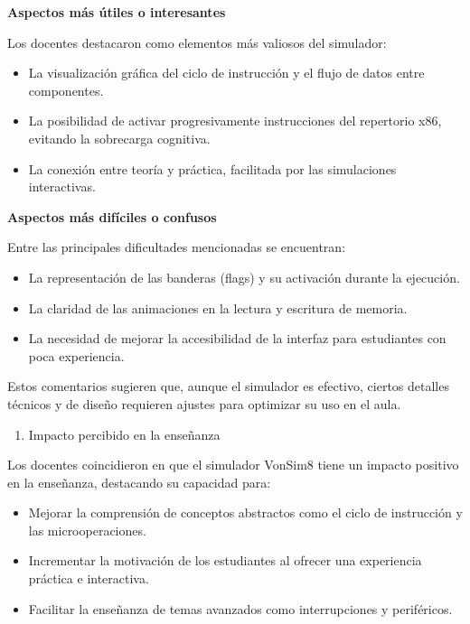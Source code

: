 \documentclass[12pt,oneside]{templates/unerthesis}
\providecommand{\tightlist}{%
  \setlength{\itemsep}{0pt}\setlength{\parskip}{0pt}}
\begin{document}
\textbf{Aspectos más útiles o interesantes}

Los docentes destacaron como elementos más valiosos del simulador:

\begin{itemize}
\tightlist
\item
  La visualización gráfica del ciclo de instrucción y el flujo de datos entre componentes.
\item
  La posibilidad de activar progresivamente instrucciones del repertorio x86, evitando la sobrecarga cognitiva.
\item
  La conexión entre teoría y práctica, facilitada por las simulaciones interactivas.
\end{itemize}

\textbf{Aspectos más difíciles o confusos}

Entre las principales dificultades mencionadas se encuentran:

\begin{itemize}
\tightlist
\item
  La representación de las banderas (flags) y su activación durante la ejecución.
\item
  La claridad de las animaciones en la lectura y escritura de memoria.
\item
  La necesidad de mejorar la accesibilidad de la interfaz para estudiantes con poca experiencia.
\end{itemize}

Estos comentarios sugieren que, aunque el simulador es efectivo, ciertos detalles técnicos y de diseño requieren ajustes para optimizar su uso en el aula.

\begin{enumerate}
\def\labelenumi{\arabic{enumi}.}
\setcounter{enumi}{4}
\tightlist
\item
  Impacto percibido en la enseñanza
\end{enumerate}

Los docentes coincidieron en que el simulador VonSim8 tiene un impacto positivo en la enseñanza, destacando su capacidad para:

\begin{itemize}
\tightlist
\item
  Mejorar la comprensión de conceptos abstractos como el ciclo de instrucción y las microoperaciones.
\item
  Incrementar la motivación de los estudiantes al ofrecer una experiencia práctica e interactiva.
\item
  Facilitar la enseñanza de temas avanzados como interrupciones y periféricos.
\end{itemize}
\end{document}
